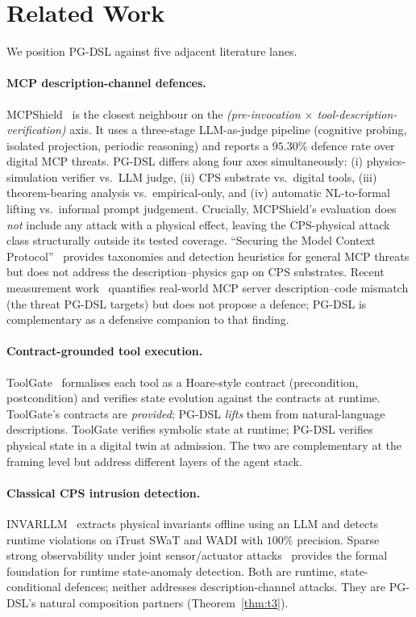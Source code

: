 \section{Related Work}
\label{sec:related}

We position PG-DSL against five adjacent literature lanes.

\paragraph{MCP description-channel defences.}
MCPShield~\cite{mcpshield} is the closest neighbour on the
\emph{(pre-invocation $\times$ tool-description-verification)} axis. It
uses a three-stage LLM-as-judge pipeline (cognitive probing, isolated
projection, periodic reasoning) and reports a $95.30\%$ defence rate
over digital MCP threats. PG-DSL differs along four axes
simultaneously: (i) physics-simulation verifier vs.\ LLM judge, (ii)
CPS substrate vs.\ digital tools, (iii) theorem-bearing analysis vs.\
empirical-only, and (iv) automatic NL-to-formal lifting vs.\ informal
prompt judgement. Crucially, MCPShield's evaluation does \emph{not}
include any attack with a physical effect, leaving the
CPS-physical attack class structurally outside its tested coverage.
``Securing the Model Context Protocol''~\cite{secure_mcp_jamshidi}
provides taxonomies and detection heuristics for general MCP threats
but does not address the description--physics gap on CPS substrates.
Recent measurement work~\cite{mcp_misleading} quantifies real-world
MCP server description--code mismatch (the threat
PG-DSL targets) but does not propose a defence;
PG-DSL is complementary as a defensive companion to that finding.

\paragraph{Contract-grounded tool execution.}
ToolGate~\cite{toolgate} formalises each tool as a Hoare-style contract
(precondition, postcondition) and verifies state evolution against the
contracts at runtime. ToolGate's contracts are \emph{provided}; PG-DSL
\emph{lifts} them from natural-language descriptions. ToolGate verifies
symbolic state at runtime; PG-DSL verifies physical state in a digital
twin at admission. The two are complementary at the framing level but
address different layers of the agent stack.

\paragraph{Classical CPS intrusion detection.}
INVARLLM~\cite{invarllm} extracts physical invariants offline using an
LLM and detects runtime violations on iTrust SWaT and WADI with
$100\%$ precision. Sparse strong observability under joint
sensor/actuator attacks~\cite{showkatbakhsh_sparse} provides the
formal foundation for runtime state-anomaly detection. Both are
runtime, state-conditional defences; neither addresses
description-channel attacks. They are PG-DSL's natural composition
partners (Theorem~\ref{thm:t3}).

